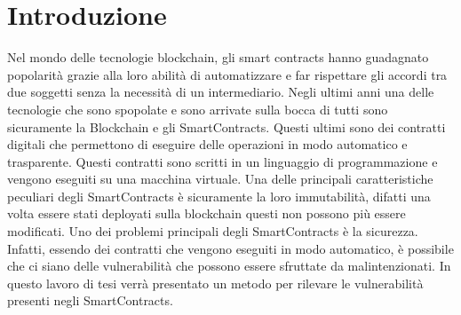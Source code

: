 \documentclass[../../Thesis.tex]{subfiles}
\begin{document}
\chapter{Introduzione}
Nel mondo delle tecnologie blockchain, gli smart contracts hanno guadagnato popolarità grazie alla loro abilità di automatizzare e far rispettare gli accordi tra due soggetti senza la necessità di un intermediario. 
Negli ultimi anni una delle tecnologie che sono spopolate e sono arrivate sulla bocca di tutti sono sicuramente la Blockchain e gli SmartContracts. Questi ultimi sono dei contratti digitali che permettono di eseguire delle operazioni in modo automatico e trasparente. Questi contratti sono scritti in un linguaggio di programmazione e vengono eseguiti su una macchina virtuale. Una delle principali caratteristiche peculiari degli SmartContracts è sicuramente la loro immutabilità, difatti una volta essere stati deployati sulla blockchain questi non possono più essere modificati.  Uno dei problemi principali degli SmartContracts è la sicurezza. Infatti, essendo dei contratti che vengono eseguiti in modo automatico, è possibile che ci siano delle vulnerabilità che possono essere sfruttate da malintenzionati. In questo lavoro di tesi verrà presentato un metodo per rilevare le vulnerabilità presenti negli SmartContracts. 
\end{document}
